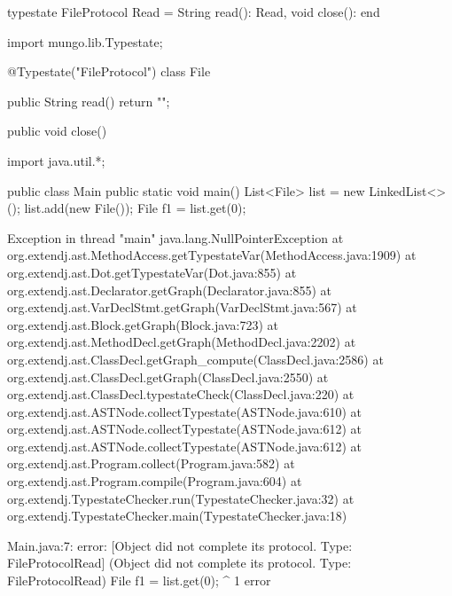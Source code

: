 \begin{code}
typestate FileProtocol {
  Read = {
    String read(): Read,
    void close(): end
  }
}\end{code}

\begin{code}
import mungo.lib.Typestate;

@Typestate("FileProtocol")
class File {

  public String read() {
    return "";
  }

  public void close() {
  }

}\end{code}

\begin{code}
import java.util.*;

public class Main {
  public static void main() {
    List<File> list = new LinkedList<>();
    list.add(new File());
    File f1 = list.get(0);
  }
}\end{code}

\lstset{language=,caption=Original Mungo output}
\begin{code}
Exception in thread "main" java.lang.NullPointerException
	at org.extendj.ast.MethodAccess.getTypestateVar(MethodAccess.java:1909)
	at org.extendj.ast.Dot.getTypestateVar(Dot.java:855)
	at org.extendj.ast.Declarator.getGraph(Declarator.java:855)
	at org.extendj.ast.VarDeclStmt.getGraph(VarDeclStmt.java:567)
	at org.extendj.ast.Block.getGraph(Block.java:723)
	at org.extendj.ast.MethodDecl.getGraph(MethodDecl.java:2202)
	at org.extendj.ast.ClassDecl.getGraph_compute(ClassDecl.java:2586)
	at org.extendj.ast.ClassDecl.getGraph(ClassDecl.java:2550)
	at org.extendj.ast.ClassDecl.typestateCheck(ClassDecl.java:220)
	at org.extendj.ast.ASTNode.collectTypestate(ASTNode.java:610)
	at org.extendj.ast.ASTNode.collectTypestate(ASTNode.java:612)
	at org.extendj.ast.ASTNode.collectTypestate(ASTNode.java:612)
	at org.extendj.ast.Program.collect(Program.java:582)
	at org.extendj.ast.Program.compile(Program.java:604)
	at org.extendj.TypestateChecker.run(TypestateChecker.java:32)
	at org.extendj.TypestateChecker.main(TypestateChecker.java:18)
\end{code}

\lstset{language=,caption=New Mungo output}
\begin{code}
Main.java:7: error: [Object did not complete its protocol. Type: FileProtocol{Read}] (Object did not complete its protocol. Type: FileProtocol{Read})
    File f1 = list.get(0);
         ^
1 error
\end{code}

